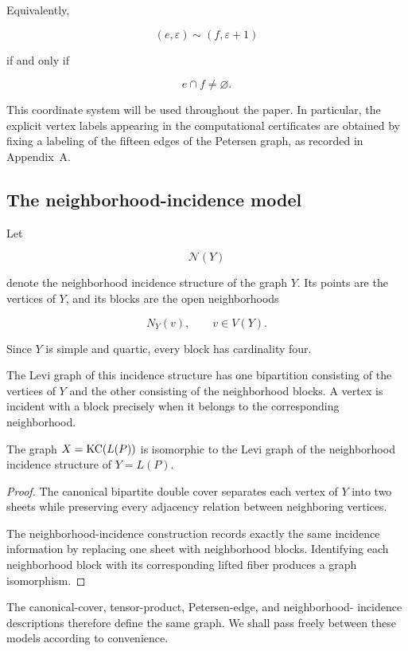 Equivalently,

\[
(e,\varepsilon)
\sim
(f,\varepsilon+1)
\]

if and only if

\[
e\cap f\neq\varnothing.
\]

This coordinate system will be used throughout the paper. In particular,
the explicit vertex labels appearing in the computational certificates are
obtained by fixing a labeling of the fifteen edges of the Petersen graph,
as recorded in Appendix~A.


\subsection{The neighborhood-incidence model}

Let

\[
\mathcal N(Y)
\]

denote the neighborhood incidence structure of the graph \(Y\). Its points
are the vertices of \(Y\), and its blocks are the open neighborhoods

\[
N_Y(v),
\qquad
v\in V(Y).
\]

Since \(Y\) is simple and quartic, every block has cardinality four.

The Levi graph of this incidence structure has one bipartition consisting
of the vertices of \(Y\) and the other consisting of the neighborhood
blocks. A vertex is incident with a block precisely when it belongs to the
corresponding neighborhood.

\begin{proposition}

The graph \(X=\operatorname{KC}(L(P))\) is isomorphic to the Levi graph of the
neighborhood incidence structure of \(Y=L(P)\).

\end{proposition}

\begin{proof}

The canonical bipartite double cover separates each vertex of \(Y\) into
two sheets while preserving every adjacency relation between neighboring
vertices.

The neighborhood-incidence construction records exactly the same incidence
information by replacing one sheet with neighborhood blocks. Identifying
each neighborhood block with its corresponding lifted fiber produces a
graph isomorphism.

\end{proof}

The canonical-cover, tensor-product, Petersen-edge, and neighborhood-
incidence descriptions therefore define the same graph. We shall pass
freely between these models according to convenience.


